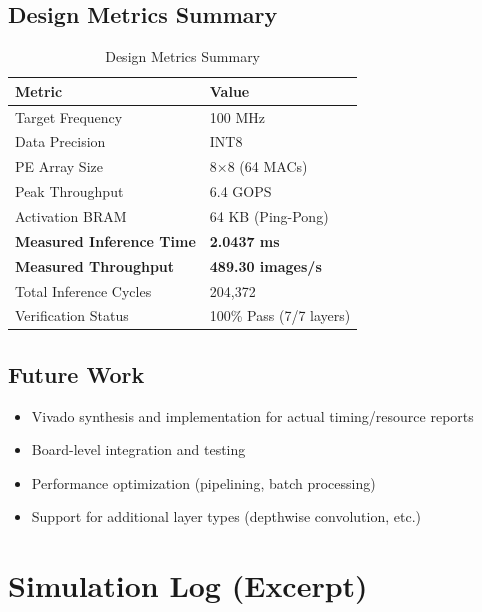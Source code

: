 \documentclass[11pt,a4paper]{article}
\begin{document}
\subsection{Design Metrics Summary}

\begin{table}[H]
\centering
\caption{Design Metrics Summary}
\begin{tabular}{ll}
\toprule
\textbf{Metric} & \textbf{Value} \\
\midrule
Target Frequency & 100 MHz \\
Data Precision & INT8 \\
PE Array Size & 8×8 (64 MACs) \\
Peak Throughput & 6.4 GOPS \\
Activation BRAM & 64 KB (Ping-Pong) \\
\textbf{Measured Inference Time} & \textbf{2.0437 ms} \\
\textbf{Measured Throughput} & \textbf{489.30 images/s} \\
Total Inference Cycles & 204,372 \\
Verification Status & 100\% Pass (7/7 layers) \\
\bottomrule
\end{tabular}
\end{table}

\subsection{Future Work}
\begin{itemize}
    \item Vivado synthesis and implementation for actual timing/resource reports
    \item Board-level integration and testing
    \item Performance optimization (pipelining, batch processing)
    \item Support for additional layer types (depthwise convolution, etc.)
\end{itemize}

\appendix
\section{Simulation Log (Excerpt)}
\end{document}
